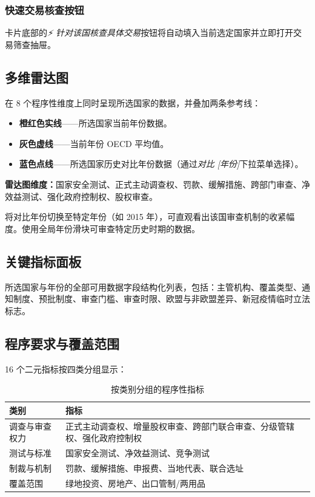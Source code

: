 \documentclass[12pt,a4paper]{article}
\newcommand{\uielem}[1]{\textit{#1}}
\begin{document}
\subsubsection{快速交易核查按钮}

卡片底部的\uielem{⚡ 针对该国核查具体交易}按钮将自动填入当前选定国家并立即打开交易筛查抽屉。

\subsection{多维雷达图}

在 8 个程序性维度上同时呈现所选国家的数据，并叠加两条参考线：

\begin{itemize}
  \item \textbf{橙红色实线}——所选国家当前年份数据。
  \item \textbf{灰色虚线}——当前年份 OECD 平均值。
  \item \textbf{蓝色点线}——所选国家历史对比年份数据（通过\uielem{对比 [年份]}下拉菜单选择）。
\end{itemize}

\textbf{雷达图维度：}国家安全测试、正式主动调查权、罚款、缓解措施、跨部门审查、净效益测试、强化政府控制权、股权审查。

\begin{tipbox}[雷达图使用技巧]
将对比年份切换至特定年份（如 2015 年），可直观看出该国审查机制的收紧幅度。使用全局年份滑块可审查特定历史时期的数据。
\end{tipbox}

\subsection{关键指标面板}

所选国家与年份的全部可用数据字段结构化列表，包括：主管机构、覆盖类型、通知制度、预批制度、审查门槛、审查时限、欧盟与非欧盟差异、新冠疫情临时立法标志。

\subsection{程序要求与覆盖范围}

16 个二元指标按四类分组显示：

\begin{table}[h]
\centering
\begin{tabularx}{\linewidth}{lX}
\toprule
\textbf{类别} & \textbf{指标} \\
\midrule
调查与审查权力 & 正式主动调查权、增量股权审查、跨部门联合审查、分级管辖权、强化政府控制权 \\
测试与标准 & 国家安全测试、净效益测试、竞争测试 \\
制裁与机制 & 罚款、缓解措施、申报费、当地代表、联合选址 \\
覆盖范围 & 绿地投资、房地产、出口管制/两用品 \\
\bottomrule
\end{tabularx}
\caption{按类别分组的程序性指标}
\end{table}
\end{document}
